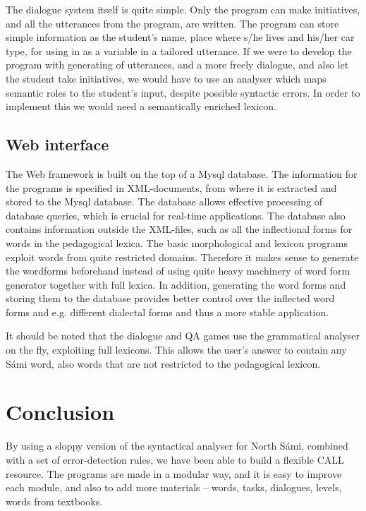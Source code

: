 \documentclass[11pt]{article}
\begin{document}
The dialogue system itself is quite simple. Only
the program can make initiatives, and all the utterances from the program, are written. The program can store simple information as the student's name, place where s/he lives and his/her car type, for using in as a variable in a tailored utterance. If we were to develop the program with generating of utterances, and a more freely dialogue, and also let the student take initiatives, we would have to use an analyser which maps semantic roles to the student's input, despite possible syntactic errors. In order to implement this we would need a semantically enriched lexicon.



\subsection{Web interface}

The Web framework is built on the top of a Mysql database. The information for the programs is specified in XML-documents, from where it is extracted and stored to the Mysql database. The database allows effective processing of database queries, which is crucial for real-time applications. The database also contains information outside the XML-files, such as all the inflectional forms for words in the pedagogical lexica. The basic morphological and lexicon programs exploit words from quite restricted domains. Therefore it makes sense to generate the wordforms beforehand instead of using quite heavy machinery of word form generator together with full lexica. In addition, generating the word forms and storing them to the database provides better control over the inflected word forms and e.g. different dialectal forms and thus a more stable application.

It should be noted that 
the dialogue and QA games
 use the grammatical analyser on the fly, exploiting full lexicons. This allows the user's answer to contain any Sámi word, also words that are not restricted to the pedagogical lexicon.



\section{Conclusion}

By using a sloppy version of the syntactical analyser for North Sámi, combined with a set of error-detection rules, we have been able to build a flexible CALL resource. The programs are made in a  modular way, and it is easy to improve each module, and also to add more materials -- words, tasks, dialogues, levels, words from textbooks. 
\end{document}
